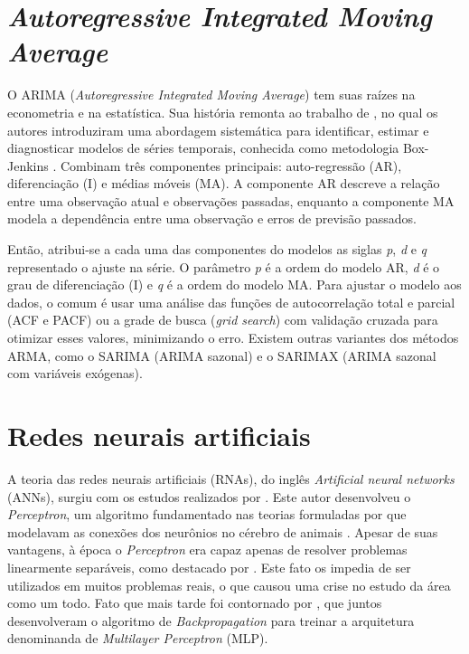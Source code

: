 \section{\textit{Autoregressive Integrated Moving Average}} \label{sec:arima}

O ARIMA (\textit{Autoregressive Integrated Moving Average}) tem suas raízes na econometria e na estatística.
Sua história remonta ao trabalho de \textcite{Box}, no qual os autores introduziram uma abordagem sistemática para identificar, estimar e diagnosticar modelos de séries temporais, conhecida como metodologia Box-Jenkins \cite{Arima}.
Combinam três componentes principais: auto-regressão (AR), diferenciação (I) e médias móveis (MA). A componente AR descreve a relação entre uma observação atual e observações passadas, enquanto a componente MA modela a dependência entre uma observação e erros de previsão passados. 

Então, atribui-se a cada uma das componentes do modelos as siglas \textit{p}, \textit{d} e \textit{q} representado o ajuste na série. O parâmetro \textit{p} é a ordem do modelo AR, \textit{d} é o grau de diferenciação (I) e \textit{q} é a ordem do modelo MA.
Para ajustar o modelo aos dados, o comum é usar uma análise das funções de autocorrelação total e parcial (ACF e PACF) ou a grade de busca (\textit{grid search}) com validação cruzada para otimizar esses valores, minimizando o erro.
Existem outras variantes dos métodos ARMA, como o SARIMA (ARIMA sazonal) e o SARIMAX (ARIMA sazonal com variáveis exógenas).
\section{Redes neurais artificiais} \label{sec:redes neurais}

A teoria das redes neurais artificiais (RNAs), do inglês \textit{Artificial neural networks} (ANNs), surgiu com os estudos realizados por \textcite{Rosenblatt}.
Este autor desenvolveu o \textit{Perceptron}, um algoritmo fundamentado nas teorias formuladas por \textcite{McCulloch, hebb} que modelavam as conexões dos neurônios no cérebro de animais \cite{Good}.
Apesar de suas vantagens, à época o \textit{Perceptron} era capaz apenas de resolver problemas linearmente separáveis, como destacado por \textcite{Minsky}. Este fato os impedia de ser utilizados em muitos problemas reais,
o que causou uma crise no estudo da área como um todo. Fato que mais tarde foi contornado por \textcite{Rumelhart}, que juntos desenvolveram o algoritmo de \textit{Backpropagation} para treinar a arquitetura denominanda de \textit{Multilayer Perceptron} (MLP).

